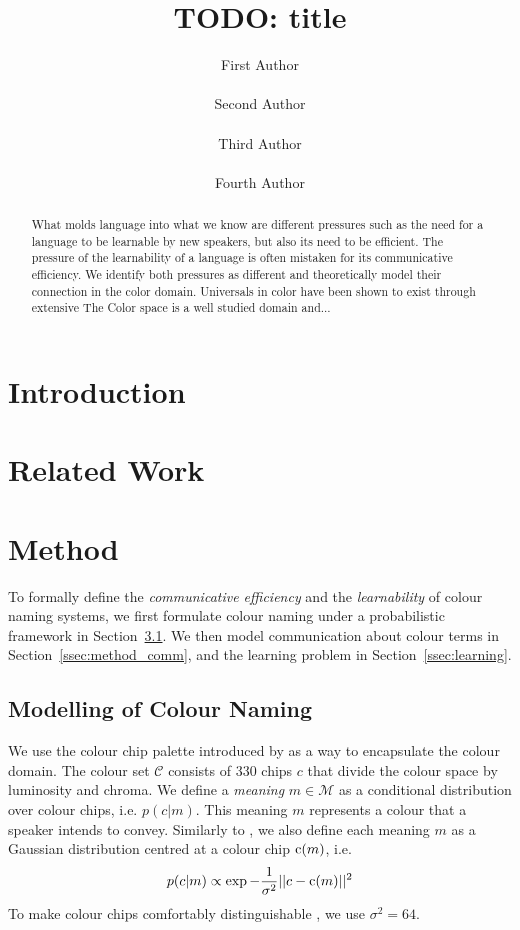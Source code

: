 \documentclass[11pt]{article}
\title{TODO: title}
\author{First Author \\
 \\\And
 Second Author \\
 \\\AND
 Third Author \\
 \\\And
 Fourth Author \\
 }
\date{}
\begin{document}
\maketitle
\begin{abstract}
  What molds language into what we know are different pressures such as the need for a language to be learnable by new speakers, but also its need to be efficient.
  The pressure of the learnability of a language is often mistaken for its communicative efficiency.
  We identify both pressures as different and theoretically model their connection in the color domain.
  Universals in color have been shown to exist through extensive 
  The Color space is a well studied domain and...
\end{abstract}

\section{Introduction}
\label{sec:intro}

\section{Related Work}
\label{sec:related_works}

\section{Method}
\label{sec:method}

To formally define the \textit{communicative efficiency} and the \textit{learnability} of colour naming systems, we first formulate colour naming under a probabilistic framework in Section~\ref{ssec:method_uni_components}.
We then model communication about colour terms in Section~\ref{ssec:method_comm}, and the learning problem in Section~\ref{ssec:learning}.

\subsection{Modelling of Colour Naming}
\label{ssec:method_uni_components}

We use the colour chip palette introduced by \citet{berlin1991basic} as a way to encapsulate the colour domain.
The colour set $\mathcal{C}$ consists of $330$ chips $c$ that divide the colour space by luminosity and chroma.
We define a \textit{meaning} $m\in\mathcal{M}$ as a conditional distribution over colour chips, i.e. $p(c|m)$.
This meaning $m$ represents a colour that a speaker intends to convey.
Similarly to \citet{zaslavsky2018efficient}, we also define each meaning $m$ as a Gaussian distribution centred at a colour chip ${\textnormal{c}}(m)$, i.e.
\begin{align}
    p(c|m)\propto \exp{-\frac{1}{\sigma^2}}||c-{\textnormal{c}}(m)||^2
    \label{eq:p_c_given_m}
\end{align}
To make colour chips comfortably distinguishable \cite{mokrzycki2011colour}, we use $\sigma^2=64$.
\end{document}
